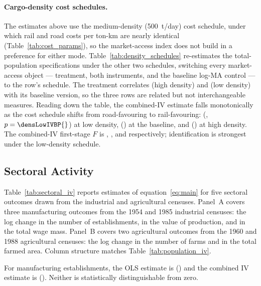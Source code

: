 \paragraph{Cargo-density cost schedules.}
The estimates above use the medium-density (500~t/day) cost schedule,
under which rail and road costs per ton-km are nearly identical
(Table~\ref{tab:cost_params}), so the market-access index does not
build in a preference for either mode.
Table~\ref{tab:density_schedules} re-estimates the total-population
specifications under the other two \citet{baumgartnerpalazzo1969}
schedules, switching every market-access object --- treatment, both
instruments, and the baseline log-MA control --- to the row's
schedule. The treatment correlates \densHighCorrBase{} (high density)
and \densLowCorrBase{} (low density) with its baseline version, so the
three rows are related but not interchangeable measures. Reading
down the table, the combined-IV estimate falls monotonically as the
cost schedule shifts from road-favouring to rail-favouring:
\densLowIVBCoef{} (\densLowIVBSE{}, $p = \densLowIVBP{}$) at low
density, \mainPopCoefIVBoth{} (\mainPopSEIVBoth{}) at the baseline,
and \densHighIVBCoef{} (\densHighIVBSE{}) at high density. The
combined-IV first-stage $F$ is \densLowF{}, \firstStageFBoth{}, and
\densHighF{} respectively; identification is strongest under the
low-density schedule.



\subsection{Sectoral Activity}
\label{sec:sectoral}

Table~\ref{tab:sectoral_iv} reports estimates of
equation~\eqref{eq:main} for five sectoral outcomes drawn from the
industrial and agricultural censuses. Panel~A covers three
manufacturing outcomes from the 1954 and 1985 industrial censuses:
the log change in the number of establishments, in the value of
production, and in the total wage mass. Panel~B covers two
agricultural outcomes from the 1960 and 1988 agricultural censuses:
the log change in the number of farms and in the total farmed area.
Column structure matches Table~\ref{tab:population_iv}.

For manufacturing establishments, the OLS estimate is \estabOLSCoef{} (\estabOLSSE{})
and the combined IV estimate is \estabIVBCoef{} (\estabIVBSE{}). Neither is
statistically distinguishable from zero.

